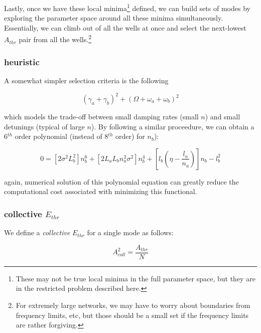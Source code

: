 Lastly, once we have these local minima\footnote{These may not be true local minima in the full parameter space, but they are in the restricted problem described here.} defined, we can build sets of modes by exploring the parameter space around all these minima simultaneously. Essentially, we can climb out of all the wells at once and select the next-lowest $A_{thr}$ pair from all the wells.\footnote{For extremely large networks, we may have to worry about boundaries from frequency limits, etc, but those should be a small set if the frequency limits are rather forgiving.}

\subsubsection*{heuristic}

A somewhat simpler selection criteria is the following

\begin{equation}
\left(\gamma_a+\gamma_b\right)^2 + \left(\Omega+\omega_a+\omega_b\right)^2
\end{equation}

which models the trade-off between small damping rates (small $n$) and small detunings (typical of large $n$). By following a similar proceedure, we can obtain a 6$^{th}$ order polynomial (instead of 8$^{th}$ order) for $n_b$):

\begin{equation}
0 = \left[2\sigma^2L_b^2\right]n_b^6 + \left[2L_aL_bn_a^2\sigma^2\right]n_b^4 + \left[l_b\left(\eta-\frac{l_a}{n_a}\right)\right]n_b - l_b^2
\end{equation}

again, numerical solution of this polynomial equation can greatly reduce the computational cost associated with minimizing this functional.

\subsubsection*{collective $E_{thr}$}

We define a \emph{collective} $E_{thr}$ for a single mode as follows:

\begin{equation}
A_{coll}^2 = \frac{A_{thr}}{N}
\end{equation}

